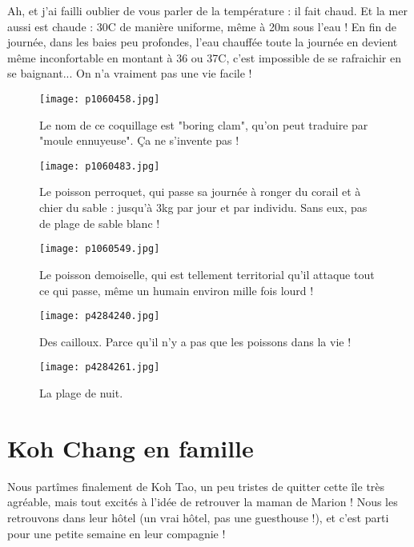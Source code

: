 \documentclass{book}
\begin{document}
Ah, et j'ai failli oublier de vous parler de la température : il fait chaud. Et la mer aussi est chaude : 30\textdegree C de manière uniforme, même à 20m sous l'eau ! En fin de journée, dans les baies peu profondes, l'eau chauffée toute la journée en devient même inconfortable en montant à 36 ou 37\textdegree C, c'est impossible de se rafraichir en se baignant... On n'a vraiment pas une vie facile !


\begin{figure}[h]
\centering
\texttt{[image: p1060458.jpg]}
\caption*{Le nom de ce coquillage est "boring clam", qu'on peut traduire par "moule ennuyeuse". Ça ne s'invente pas !}
\end{figure}


\begin{figure}[h]
\centering
\texttt{[image: p1060483.jpg]}
\caption*{Le poisson perroquet, qui passe sa journée à ronger du corail et à chier du sable : jusqu'à 3kg par jour et par individu. Sans eux, pas de plage de sable blanc !}
\end{figure}


\begin{figure}[h]
\centering
\texttt{[image: p1060549.jpg]}
\caption*{Le poisson demoiselle, qui est tellement territorial qu'il attaque tout ce qui passe, même un humain environ mille fois lourd !}
\end{figure}


\begin{figure}[h]
\centering
\texttt{[image: p4284240.jpg]}
\caption*{Des cailloux. Parce qu'il n'y a pas que les poissons dans la vie !}
\end{figure}


\begin{figure}[h]
\centering
\texttt{[image: p4284261.jpg]}
\caption*{La plage de nuit.}
\end{figure}



\chapter{Koh Chang en famille}
Nous partîmes finalement de Koh Tao, un peu tristes de quitter cette île très agréable, mais tout excités à l'idée de retrouver la maman de Marion ! Nous les retrouvons dans leur hôtel (un vrai hôtel, pas une guesthouse !), et c'est parti pour une petite semaine en leur compagnie !
\end{document}

